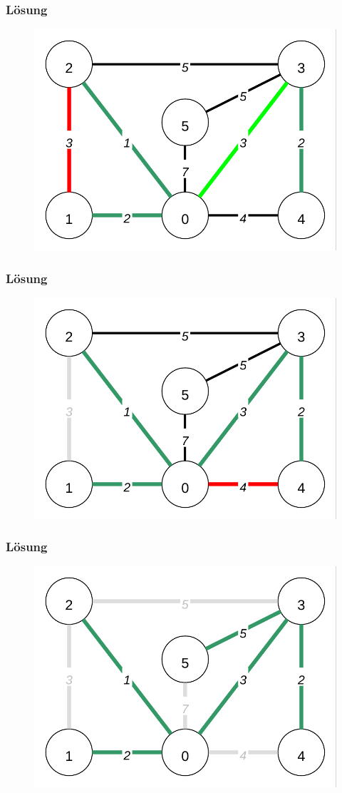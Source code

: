 \begin{frame}
\frametitle{Lösung}
\begin{figure}
\includegraphics[width=0.75\linewidth, trim = 2mm 2mm 2mm 2mm, clip = true]{kruskal_graphs/graph4.pdf}
\end{figure}
\end{frame}

\begin{frame}
\frametitle{Lösung}
\begin{figure}
\includegraphics[width=0.75\linewidth, trim = 2mm 2mm 2mm 2mm, clip = true]{kruskal_graphs/graph5.pdf}
\end{figure}
\end{frame}

\begin{frame}
\frametitle{Lösung}
\begin{figure}
\includegraphics[width=0.75\linewidth, trim = 2mm 2mm 2mm 2mm, clip = true]{kruskal_graphs/graph6.pdf}
\end{figure}
\end{frame}

